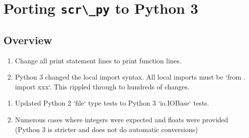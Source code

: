 \chapter{Porting \lstinline[style=HUGE]{scr\_py} to Python 3}
\label{chap:Portingscr_pytoPython3}

\section{Overview}
\label{sec:Portingscr_pytoPython3}

\begin{enumerate}
\item Change all print statement lines to print function lines.

\item Python 3 changed the local import syntax. All local imports must be `from . import xxx`. This rippled through to hundreds of changes.



\end{enumerate}


\begin{enumerate}



\item Updated Python 2 `file` type tests to Python 3 `io.IOBase` tests.

\item Numerous cases where integers were expected and floats were provided (Python 3 is stricter and does not do automatic conversions)

\end{enumerate}

